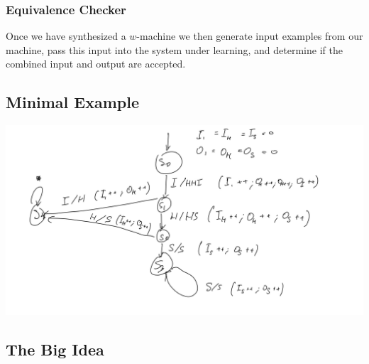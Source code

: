 \subsubsection{Equivalence Checker}
Once we have synthesized a $w$-machine we then generate input examples from our machine, 
pass this input into the system under learning,
and determine if the combined input and output are accepted.

\subsection{Minimal Example}
\includegraphics[width=\textwidth]{graphics/example-drawing.jpg}




\subsection{The Big Idea}
